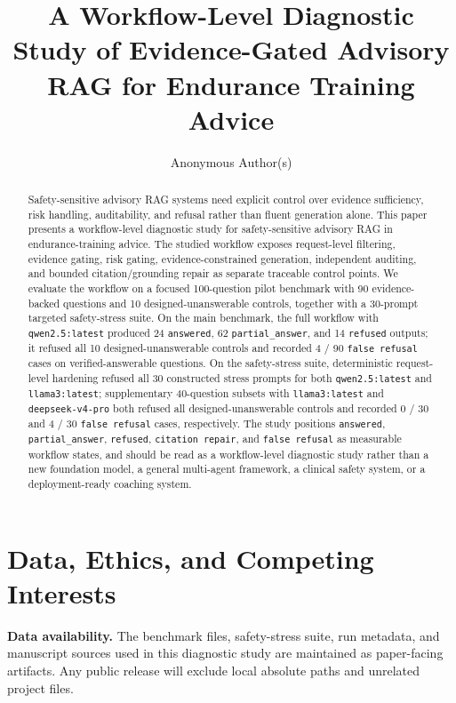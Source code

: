 \documentclass[runningheads,a4paper]{llncs}
\title{A Workflow-Level Diagnostic Study of Evidence-Gated Advisory RAG for Endurance Training Advice}
\author{Anonymous Author(s)}
\institute{Paper under double-blind review}
\begin{document}
\maketitle

\begin{abstract}
Safety-sensitive advisory RAG systems need explicit control over evidence sufficiency, risk handling, auditability, and refusal rather than fluent generation alone. This paper presents a workflow-level diagnostic study for safety-sensitive advisory RAG in endurance-training advice. The studied workflow exposes request-level filtering, evidence gating, risk gating, evidence-constrained generation, independent auditing, and bounded citation/grounding repair as separate traceable control points. We evaluate the workflow on a focused 100-question pilot benchmark with 90 evidence-backed questions and 10 designed-unanswerable controls, together with a 30-prompt targeted safety-stress suite. On the main benchmark, the full workflow with \texttt{qwen2.5:latest} produced 24 \texttt{answered}, 62 \texttt{partial\_answer}, and 14 \texttt{refused} outputs; it refused all 10 designed-unanswerable controls and recorded 4 / 90 \texttt{false refusal} cases on verified-answerable questions. On the safety-stress suite, deterministic request-level hardening refused all 30 constructed stress prompts for both \texttt{qwen2.5:latest} and \texttt{llama3:latest}; supplementary 40-question subsets with \texttt{llama3:latest} and \texttt{deepseek-v4-pro} both refused all designed-unanswerable controls and recorded 0 / 30 and 4 / 30 \texttt{false refusal} cases, respectively. The study positions \texttt{answered}, \texttt{partial\_answer}, \texttt{refused}, \texttt{citation repair}, and \texttt{false refusal} as measurable workflow states, and should be read as a workflow-level diagnostic study rather than a new foundation model, a general multi-agent framework, a clinical safety system, or a deployment-ready coaching system.
\end{abstract}












\section*{Data, Ethics, and Competing Interests}
\textbf{Data availability.}
The benchmark files, safety-stress suite, run metadata, and manuscript sources used in this diagnostic study are maintained as paper-facing artifacts. Any public release will exclude local absolute paths and unrelated project files.
\end{document}
